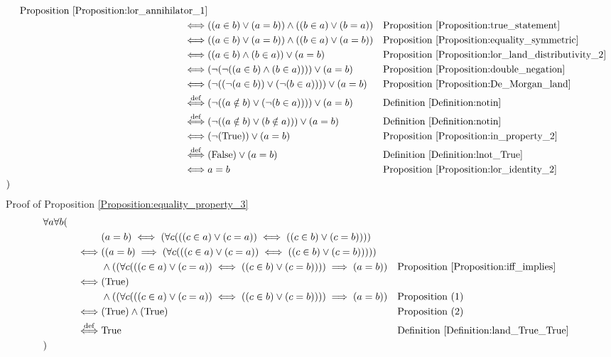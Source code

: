 \begin{prop}
\begin{align*}
& & \text{Proposition \ref{Proposition:lor_annihilator_1}} \\
& & \iff & ((a \in b) \lor (a = b)) \land ((b \in a) \lor (b = a))
& & \text{Proposition \ref{Proposition:true_statement}} \\
& & \iff & ((a \in b) \lor (a = b)) \land ((b \in a) \lor (a = b))
& & \text{Proposition \ref{Proposition:equality_symmetric}} \\
& & \iff & ((a \in b) \land (b \in a)) \lor (a = b)
& & \text{Proposition \ref{Proposition:lor_land_distributivity_2}} \\
& & \iff & (\lnot (\lnot ((a \in b) \land (b \in a)))) \lor (a = b)
& & \text{Proposition \ref{Proposition:double_negation}} \\
& & \iff & (\lnot ((\lnot (a \in b)) \lor (\lnot (b \in a)))) \lor (a = b)
& & \text{Proposition \ref{Proposition:De_Morgan_land}} \\
& & \overset{\operatorname{def}}{\iff} & (\lnot ((a \notin b) \lor (\lnot (b \in a)))) \lor (a = b)
& & \text{Definition \ref{Definition:notin}} \\
& & \overset{\operatorname{def}}{\iff} & (\lnot ((a \notin b) \lor (b \notin a))) \lor (a = b)
& & \text{Definition \ref{Definition:notin}} \\
& & \iff & (\lnot (\text{True})) \lor (a = b)
& & \text{Proposition \ref{Proposition:in_property_2}} \\
& & \overset{\operatorname{def}}{\iff} & (\text{False}) \lor (a = b)
& & \text{Definition \ref{Definition:lnot_True}} \\
& & \iff & a = b
& & \text{Proposition \ref{Proposition:lor_identity_2}} \\
& )
\end{align*}
Proof of Proposition \ref{Proposition:equality_property_3}
\begin{align*}
& \forall a \forall b ( \\
& & & (a = b) \iff (\forall c (((c \in a) \lor (c = a)) \iff ((c \in b) \lor (c = b)))) \\
& & \iff & ((a = b) \implies (\forall c (((c \in a) \lor (c = a)) \iff ((c \in b) \lor (c = b))))) \\
& & & \land ((\forall c (((c \in a) \lor (c = a)) \iff ((c \in b) \lor (c = b)))) \implies (a = b))
& & \text{Proposition \ref{Proposition:iff_implies}} \\
& & \iff & (\text{True}) \\
& & & \land ((\forall c (((c \in a) \lor (c = a)) \iff ((c \in b) \lor (c = b)))) \implies (a = b))
& & \text{Proposition (1)} \\
& & \iff & (\text{True}) \land (\text{True})
& & \text{Proposition (2)} \\
& & \overset{\operatorname{def}}{\iff} & \text{True}
& & \text{Definition \ref{Definition:land_True_True}} \\
& )
\end{align*}
\end{prop}


